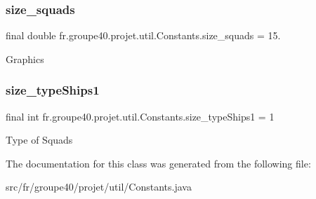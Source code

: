 \subsubsection{\texorpdfstring{size\+\_\+squads}{size\_squads}}
{\footnotesize\ttfamily final double fr.\+groupe40.\+projet.\+util.\+Constants.\+size\+\_\+squads = 15.\hspace{0.3cm}{\ttfamily [static]}}

Graphics \mbox{\label{classfr_1_1groupe40_1_1projet_1_1util_1_1_Constants_aae58c6abfb1e6f953eb91a86b61db339}} 
\subsubsection{\texorpdfstring{size\+\_\+type\+Ships1}{size\_typeShips1}}
{\footnotesize\ttfamily final int fr.\+groupe40.\+projet.\+util.\+Constants.\+size\+\_\+type\+Ships1 = 1\hspace{0.3cm}{\ttfamily [static]}}

Type of Squads 

The documentation for this class was generated from the following file\+:\begin{DoxyCompactItemize}
\item 
src/fr/groupe40/projet/util/Constants.\+java\end{DoxyCompactItemize}
